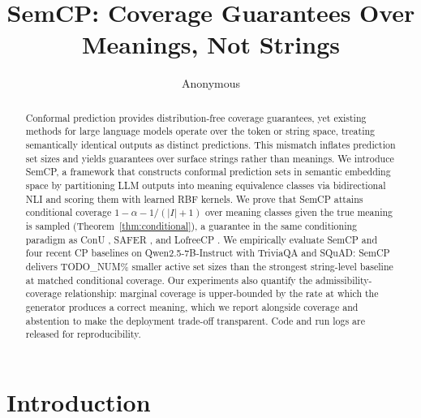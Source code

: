 \documentclass{article}
\title{SemCP: Coverage Guarantees Over Meanings, Not Strings}
\author{Anonymous}
\begin{document}
\begin{abstract}
Conformal prediction provides distribution-free coverage guarantees, yet existing methods for large language models operate over the token or string space, treating semantically identical outputs as distinct predictions. This mismatch inflates prediction set sizes and yields guarantees over surface strings rather than meanings. We introduce SemCP, a framework that constructs conformal prediction sets in semantic embedding space by partitioning LLM outputs into meaning equivalence classes via bidirectional NLI and scoring them with learned RBF kernels. We prove that SemCP attains conditional coverage $1 - \alpha - 1/(|I|+1)$ over meaning classes given the true meaning is sampled (Theorem~\ref{thm:conditional}), a guarantee in the same conditioning paradigm as ConU \citep{wang2024conu}, SAFER \citep{kumar2025safer}, and LofreeCP \citep{su2024lofreecp}. We empirically evaluate SemCP and four recent CP baselines on Qwen2.5-7B-Instruct with TriviaQA and SQuAD: SemCP delivers TODO\_NUM\% smaller active set sizes than the strongest string-level baseline at matched conditional coverage. Our experiments also quantify the admissibility-coverage relationship: marginal coverage is upper-bounded by the rate at which the generator produces a correct meaning, which we report alongside coverage and abstention to make the deployment trade-off transparent. Code and run logs are released for reproducibility.
\end{abstract}

\maketitle

\section{Introduction}

\label{sec:introduction}
\end{document}
